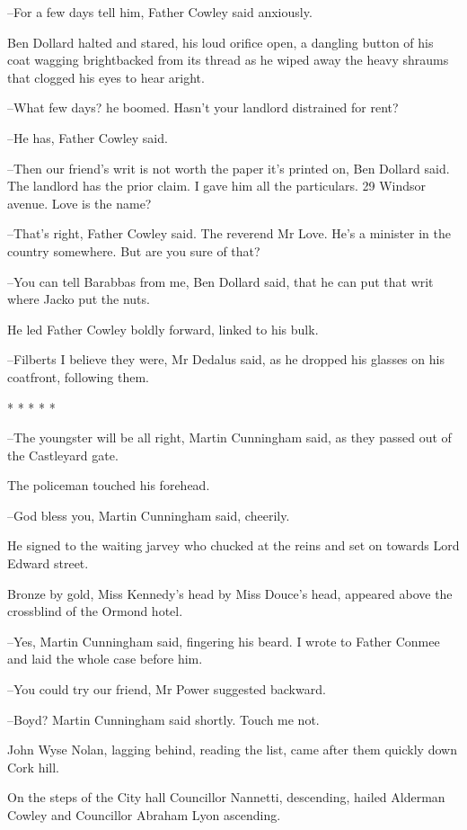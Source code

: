 --For a few days tell him, Father Cowley said anxiously.

Ben Dollard halted and stared, his loud orifice open, a dangling button
of his coat wagging brightbacked from its thread as he wiped away the
heavy shraums that clogged his eyes to hear aright.

--What few days? he boomed. Hasn't your landlord distrained for rent?

--He has, Father Cowley said.

--Then our friend's writ is not worth the paper it's printed on, Ben
Dollard said. The landlord has the prior claim. I gave him all the
particulars. 29 Windsor avenue. Love is the name?

--That's right, Father Cowley said. The reverend Mr Love. He's a minister
in the country somewhere. But are you sure of that?

--You can tell Barabbas from me, Ben Dollard said, that he can put that
writ where Jacko put the nuts.

He led Father Cowley boldly forward, linked to his bulk.

--Filberts I believe they were, Mr Dedalus said, as he dropped his
glasses on his coatfront, following them.


    * * * * *


--The youngster will be all right, Martin Cunningham said, as they passed
out of the Castleyard gate.

The policeman touched his forehead.

--God bless you, Martin Cunningham said, cheerily.

He signed to the waiting jarvey who chucked at the reins and set on
towards Lord Edward street.

Bronze by gold, Miss Kennedy's head by Miss Douce's head, appeared above
the crossblind of the Ormond hotel.

--Yes, Martin Cunningham said, fingering his beard. I wrote to Father
Conmee and laid the whole case before him.

--You could try our friend, Mr Power suggested backward.

--Boyd? Martin Cunningham said shortly. Touch me not.

John Wyse Nolan, lagging behind, reading the list, came after them
quickly down Cork hill.

On the steps of the City hall Councillor Nannetti, descending, hailed
Alderman Cowley and Councillor Abraham Lyon ascending.

